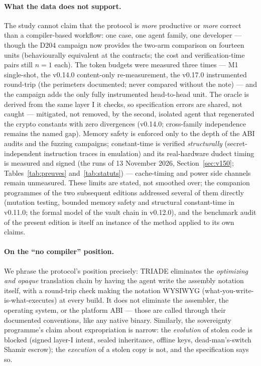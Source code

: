 \documentclass[10pt,a4paper]{article}
\begin{document}
\paragraph{What the data does not support.} The study cannot claim that
the protocol is \emph{more} productive or \emph{more} correct than a
compiler-based workflow: one case, one agent family, one developer ---
though the D204 campaign now provides the two-arm comparison on fourteen
units (behaviourally equivalent at the contracts; the cost and
verification-time pairs still $n{=}1$ each). The token budgets were
measured three times --- M1 single-shot, the v0.14.0 content-only
re-measurement, the v0.17.0 instrumented round-trip (the perimeters
documented; never compared without the note) --- and the campaign adds
the only fully instrumented head-to-head unit. The oracle is derived
from the same layer I it checks, so
specification errors are shared, not caught --- mitigated, not removed,
by the second, isolated agent that regenerated the crypto constants
with zero divergences (v0.14.0; cross-family independence remains the
named gap). Memory safety is enforced
only to the depth of the ABI audits and the fuzzing campaigns;
constant-time is verified \emph{structurally} (secret-independent
instruction traces in emulation) and its real-hardware dudect timing is
measured and signed (the runs of 13 November 2026,
Section~\ref{sec:v150}; Tables~\ref{tab:preuves} and~\ref{tab:statuts})
--- cache-timing and power side channels remain unmeasured. These limits
are stated, not smoothed over; the companion
programmes of the two subsequent editions addressed several of them
directly (mutation testing, bounded memory safety and structural
constant-time in v0.11.0; the formal model of the vault chain in
v0.12.0), and the benchmark audit of the present edition is itself an
instance of the method applied to its own claims.

\paragraph{On the ``no compiler'' position.} We phrase the protocol's
position precisely: TRIADE eliminates the \emph{optimizing and opaque}
translation chain by having the agent write the assembly notation itself,
with a round-trip check making the notation WYSIWYG
(what-you-write-is-what-executes) at every build. It does not eliminate
the assembler, the operating system, or the platform ABI --- those are
called through their documented conventions, like any native binary.
Similarly, the sovereignty programme's claim about expropriation is
narrow: the \emph{evolution} of stolen code is blocked (signed layer-I
intent, sealed inheritance, offline keys, dead-man's-switch Shamir
escrow); the \emph{execution} of a stolen copy is not, and the
specification says so.
\end{document}
